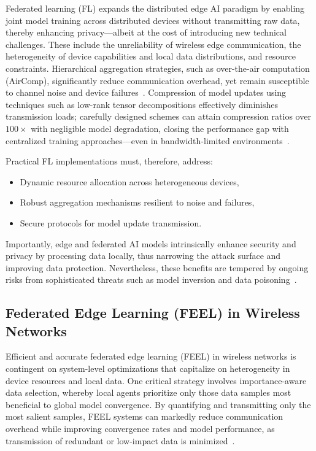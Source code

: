 \documentclass[sigconf]{acmart}
\begin{document}
Federated learning (FL) expands the distributed edge AI paradigm by enabling joint model training across distributed devices without transmitting raw data, thereby enhancing privacy—albeit at the cost of introducing new technical challenges. These include the unreliability of wireless edge communication, the heterogeneity of device capabilities and local data distributions, and resource constraints. Hierarchical aggregation strategies, such as over-the-air computation (AirComp), significantly reduce communication overhead, yet remain susceptible to channel noise and device failures~\cite{ref23}. Compression of model updates using techniques such as low-rank tensor decompositions effectively diminishes transmission loads; carefully designed schemes can attain compression ratios over $100\times$ with negligible model degradation, closing the performance gap with centralized training approaches—even in bandwidth-limited environments~\cite{ref23}.

Practical FL implementations must, therefore, address:
\begin{itemize}
    \item Dynamic resource allocation across heterogeneous devices,
    \item Robust aggregation mechanisms resilient to noise and failures,
    \item Secure protocols for model update transmission.
\end{itemize}

Importantly, edge and federated AI models intrinsically enhance security and privacy by processing data locally, thus narrowing the attack surface and improving data protection. Nevertheless, these benefits are tempered by ongoing risks from sophisticated threats such as model inversion and data poisoning~\cite{ref17,ref19,ref23,ref24}.

\subsection{Federated Edge Learning (FEEL) in Wireless Networks}

Efficient and accurate federated edge learning (FEEL) in wireless networks is contingent on system-level optimizations that capitalize on heterogeneity in device resources and local data. One critical strategy involves importance-aware data selection, whereby local agents prioritize only those data samples most beneficial to global model convergence. By quantifying and transmitting only the most salient samples, FEEL systems can markedly reduce communication overhead while improving convergence rates and model performance, as transmission of redundant or low-impact data is minimized~\cite{ref42}. 
\end{document}
